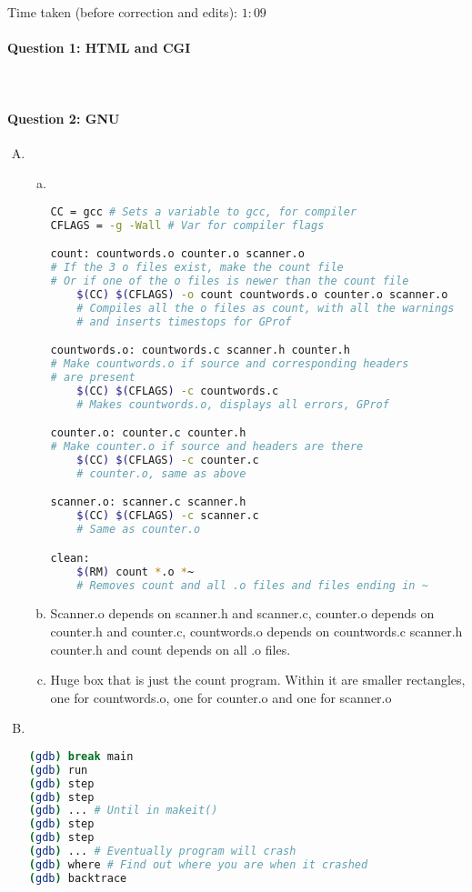 \documentclass[12 pt]{article}
\begin{document}
\onehalfspacing
Time taken (before correction and edits): $1:09$
\paragraph{Question 1: HTML and CGI}~

\paragraph{Question 2: GNU}
\begin{enumerate}[(A)]
\item ~
  \begin{enumerate}[(a)]
  \item ~
\begin{lstlisting}[language=bash]
CC = gcc # Sets a variable to gcc, for compiler
CFLAGS = -g -Wall # Var for compiler flags

count: countwords.o counter.o scanner.o
# If the 3 o files exist, make the count file
# Or if one of the o files is newer than the count file
    $(CC) $(CFLAGS) -o count countwords.o counter.o scanner.o
    # Compiles all the o files as count, with all the warnings
    # and inserts timestops for GProf

countwords.o: countwords.c scanner.h counter.h
# Make countwords.o if source and corresponding headers
# are present
    $(CC) $(CFLAGS) -c countwords.c
    # Makes countwords.o, displays all errors, GProf

counter.o: counter.c counter.h
# Make counter.o if source and headers are there
    $(CC) $(CFLAGS) -c counter.c
    # counter.o, same as above

scanner.o: scanner.c scanner.h
    $(CC) $(CFLAGS) -c scanner.c
    # Same as counter.o

clean:
    $(RM) count *.o *~
    # Removes count and all .o files and files ending in ~
\end{lstlisting}
  \item Scanner.o depends on scanner.h and scanner.c, counter.o depends on counter.h and counter.c, countwords.o depends on countwords.c scanner.h counter.h and count depends on all .o files.
    \item Huge box that is just the count program. Within it are smaller rectangles, one for countwords.o, one for counter.o and one for scanner.o
  \end{enumerate}
\item ~
\begin{lstlisting}[language=bash]
(gdb) break main
(gdb) run
(gdb) step
(gdb) step
(gdb) ... # Until in makeit()
(gdb) step
(gdb) step
(gdb) ... # Eventually program will crash
(gdb) where # Find out where you are when it crashed
(gdb) backtrace
\end{lstlisting}
\end{enumerate}
\end{document}
